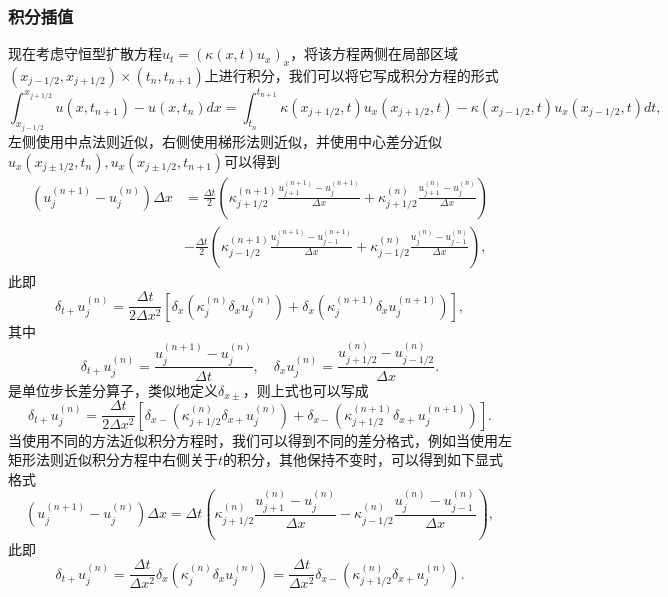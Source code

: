 \documentclass[a4paper,10pt]{ctexart}
\begin{document}
\subsubsection{积分插值}
现在考虑守恒型扩散方程$ u_t = (\kappa(x,t)u_x)_x $，将该方程两侧在局部区域$ (x_{j - 1/2},x_{j+1 / 2})\times (t_n,t_{n+1}) $上进行积分，我们可以将它写成积分方程的形式
\begin{equation}
    \int_{x_{j-1/2}}^{x_{j+1/2}} u(x,t_{n+1}) - u(x,t_n) d x = \int_{t_n}^{t_{n+1}} \kappa(x_{j+1/2},t)u_x(x_{j+1/2},t) - \kappa(x_{j-1/2},t)u_x(x_{j-1/2},t) d t,
\end{equation}
左侧使用中点法则近似，右侧使用梯形法则近似，并使用中心差分近似$ u_x(x_{j\pm 1/2},t_n),u_x(x_{j\pm 1/2},t_{n+1}) $可以得到
\begin{equation}
    \begin{aligned}
        (u^{(n+1)}_j - u^{(n)}_j)\Delta x 
        &= \frac{\Delta t}{2}(\kappa_{j+1/2}^{(n+1)} \frac{u^{(n+1)}_{j+1} - u^{(n+1)}_j}{\Delta x}+\kappa_{j+1/2}^{(n)}\frac{u^{(n)}_{j+1} - u^{(n)}_j}{\Delta x}) \\
        &- \frac{\Delta t}{2}(\kappa_{j-1/2}^{(n+1)}\frac{u^{(n+1)}_{j} - u^{(n+1)}_{j-1}}{\Delta x}+\kappa_{j-1/2}^{(n)}\frac{u^{(n)}_{j} - u^{(n)}_{j-1}}{\Delta x}),
    \end{aligned}
\end{equation}
此即
\begin{equation}
    \delta_{t+} u^{(n)}_j = \frac{\Delta t}{2\Delta x^2}[\delta_{x}(\kappa_{j}^{(n)}\delta_{x}u^{(n)}_j) + \delta_{x}(\kappa_{j}^{(n+1)}\delta_{x}u^{(n+1)}_j)],
\end{equation}
其中
\[
    \delta_{t+} u^{(n)}_j = \frac{u^{(n+1)}_j - u^{(n)}_j}{\Delta t},\quad \delta_{x} u^{(n)}_j = \frac{u^{(n)}_{j+1 / 2} - u^{(n)}_{j-1 / 2}}{\Delta x}.  
\]
是单位步长差分算子，类似地定义$ \delta_{x\pm} $，则上式也可以写成
\begin{equation}
    \delta_{t+} u^{(n)}_j = \frac{\Delta t}{2\Delta x^2}[\delta_{x-}(\kappa_{j+1 / 2}^{(n)}\delta_{x+}u^{(n)}_j) + \delta_{x-}(\kappa_{j+1 / 2}^{(n+1)}\delta_{x+}u^{(n+1)}_j)].
\end{equation}
当使用不同的方法近似积分方程时，我们可以得到不同的差分格式，例如当使用左矩形法则近似积分方程中右侧关于$ t $的积分，其他保持不变时，可以得到如下显式格式
\begin{equation}
    (u^{(n+1)}_j - u^{(n)}_j)\Delta x = \Delta t(\kappa_{j+1/2}^{(n)} \frac{u^{(n)}_{j+1} - u^{(n)}_j}{\Delta x}-\kappa_{j-1/2}^{(n)}\frac{u^{(n)}_{j} - u^{(n)}_{j-1}}{\Delta x}),
\end{equation}
此即
\begin{equation}
    \delta_{t+} u^{(n)}_j = \frac{\Delta t}{\Delta x^2}\delta_{x}(\kappa_{j}^{(n)}\delta_{x}u^{(n)}_j) = \frac{\Delta t}{\Delta x^2}\delta_{x-}(\kappa_{j+1 / 2}^{(n)}\delta_{x+}u^{(n)}_j).
\end{equation}
\end{document}
